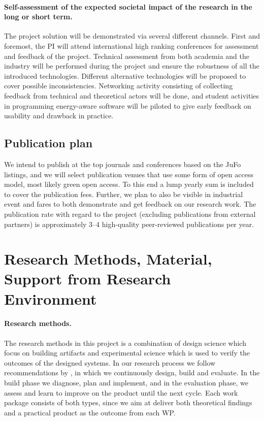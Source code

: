 \documentclass{article}
\begin{document}
\paragraph{Self-assessment of the expected societal impact of the research in the long or short term.}
The project solution will be demonstrated via several different channels.
First and foremost, the PI will attend international high ranking conferences for assessment and feedback of the project.
Technical assessment from both academia and the industry will be performed during the project and ensure the robustness of all the introduced technologies.
Different alternative technologies will be proposed to cover possible inconsistencies.
Networking activity consisting of collecting feedback from technical and theoretical actors will be done,
and student activities in programming energy-aware software will be piloted to give early feedback on usability and drawback in practice.


\subsection{Publication plan}
We intend to publish at the top journals and conferences based on the JuFo listings, and we will select publication venues that use some form of open access model, most likely green open access. 
To this end a lump yearly sum is included to cover the publication fees. 
Further, we plan to also be visible in industrial event and fares to both demonstrate and get feedback on our research work.
The publication rate with regard to the project (excluding publications from external partners) is approximately 3--4 high-quality peer-reviewed publications per year.\smallskip

\section{Research Methods, Material, Support from Research Environment}
\paragraph{Research methods. }
The research methods in this project is a combination of design science which focus on building artifacts and experimental science which is used to verify the outcomes of the designed systems.
In our research process we follow recommendations by \cite{Hevner:04}, \cite{Jarvinen:01} in which we continuously design, build and evaluate.
In the build phase we diagnose, plan and implement, and in the evaluation phase, we assess and learn to improve on the product until the next cycle.
Each work package consists of both types, since we aim at deliver both theoretical findings and a practical product as the outcome from each WP.\smallskip
\end{document}
